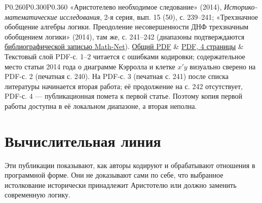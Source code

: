 \documentclass[12pt,a4paper]{article}
\begin{document}
\begin{longtable}{P{0.260\textwidth}P{0.300\textwidth}P{0.360\textwidth}}
«Аристотелево необходимое следование» (2014), \emph{Историко-математические исследования}, 2-я серия, вып. 15 (50), с. 239–241; «Трехзначное обобщение алгебры логики. Преодоление несовершенности ДНФ трехзначным обобщением логики» (2014), там же, с. 241–242 (диапазоны подтверждаются \href{https://www.mathnet.ru/php/person.phtml?option_lang=rus\&personid=68115}{библиографической записью Math-Net}). \href{https://ternarycomp.cs.msu.ru/Papers/Brusen_IMI14_Neobh_sled.pdf}{Общий PDF} & \href{../sources/pdfs/Брусенцов_Аристотелево-необходимое-следование-и-ДНФ_2014.pdf}{PDF, 4 страницы} & Текстовый слой PDF-с. 1–2 читается с ошибками кодировки; содержательное место статьи 2014 года о диаграмме Кэрролла и клетке \(x'y\) визуально сверено на PDF-с. 2 (печатная с. 240). На PDF-с. 3 (печатная с. 241) после списка литературы начинается вторая работа; её продолжение на с. 242 отсутствует, PDF-с. 4 — публикационная помета к первой статье. Поэтому копия первой работы доступна в её локальном диапазоне, а вторая неполна. \\
\bottomrule
\end{longtable}

\section{Вычислительная линия}

Эти публикации показывают, как авторы кодируют и обрабатывают отношения в программной форме. Они не доказывают сами по себе, что выбранное истолкование исторически принадлежит Аристотелю или должно заменить современную логику.
\end{document}
